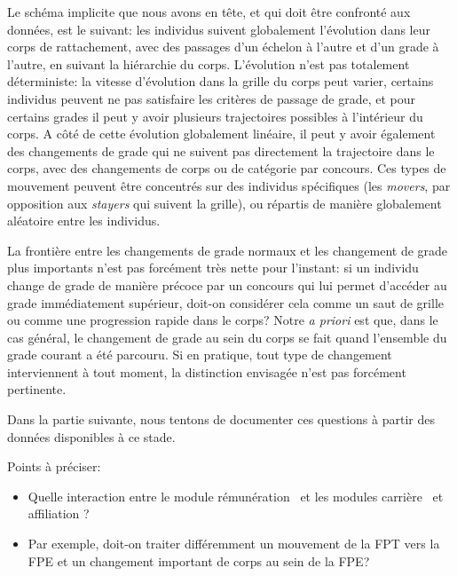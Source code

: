 \documentclass[11pt,a4paper]{article}
\begin{document}
Le schéma implicite que nous avons en tête, et qui doit être confronté aux données, est le suivant: les individus suivent globalement l'évolution dans leur corps de rattachement, avec des passages d'un échelon à l'autre et d'un grade à l'autre, en suivant la hiérarchie du corps. L'évolution n'est pas totalement déterministe: la vitesse d'évolution dans la grille du corps peut varier, certains individus peuvent ne pas satisfaire les critères de passage de grade, et pour certains grades il peut y avoir plusieurs trajectoires possibles à l'intérieur du corps. A côté de cette évolution globalement linéaire, il peut y avoir également des changements de grade qui ne suivent pas directement la trajectoire dans le corps, avec des changements de corps ou de catégorie par concours. Ces types de mouvement peuvent être concentrés sur des individus spécifiques (les \textit{movers}, par opposition aux \textit{stayers} qui suivent la grille), ou répartis de manière globalement aléatoire entre les individus. 

La frontière entre les changements de grade \og normaux \fg{}  et les changement de grade plus importants n'est pas forcément très nette pour l'instant: si un individu change de grade de manière précoce par un concours qui lui permet d'accéder au grade immédiatement supérieur, doit-on considérer cela comme un saut de grille ou comme une progression rapide dans le corps? Notre \textit{a priori} est que, dans le cas général, le changement de grade au sein du corps se fait quand l'ensemble du grade courant a été parcouru. Si en pratique, tout type de changement interviennent à tout moment, la distinction envisagée n'est pas forcément pertinente.  


Dans la partie suivante, nous tentons de documenter ces questions à partir des données disponibles à ce stade. 


\vspace{0.5cm}
Points à préciser: 
\begin{itemize}[leftmargin=1cm ,parsep=0cm,itemsep=0cm,topsep=0cm] 
\item Quelle interaction entre le module \og rémunération \fg\ et les modules \og carrière \fg\ et \og affiliation \fg ?   
\item[] Par exemple, doit-on traiter différemment un mouvement de la FPT vers la FPE et un changement important de corps au sein de la FPE? 
\end{itemize}



\ifx\isEmbedded\undefined
\newpage
 

\end{document}
